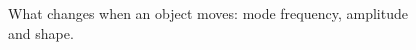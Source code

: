 \begin{figure}[t]
\centering

\caption{What changes when an object moves: mode frequency, amplitude and shape.}
\label{fig:mode_changes}
\end{figure}
